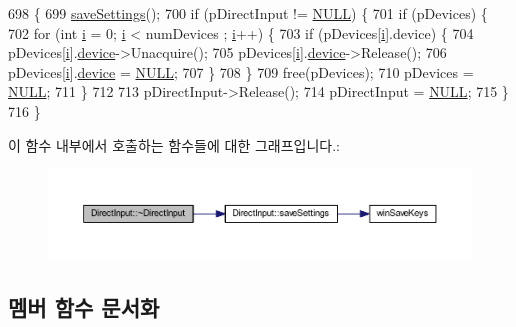 \begin{DoxyCode}
698 \{
699     \mbox{\hyperlink{class_direct_input_aaf3473a97962c8dad1ef6715b5164c9d}{saveSettings}}();
700     \textcolor{keywordflow}{if} (pDirectInput != \mbox{\hyperlink{getopt1_8c_a070d2ce7b6bb7e5c05602aa8c308d0c4}{NULL}}) \{
701         \textcolor{keywordflow}{if} (pDevices) \{
702             \textcolor{keywordflow}{for} (\textcolor{keywordtype}{int} \mbox{\hyperlink{expr-lex_8cpp_acb559820d9ca11295b4500f179ef6392}{i}} = 0; \mbox{\hyperlink{expr-lex_8cpp_acb559820d9ca11295b4500f179ef6392}{i}} < numDevices ; \mbox{\hyperlink{expr-lex_8cpp_acb559820d9ca11295b4500f179ef6392}{i}}++) \{
703                 \textcolor{keywordflow}{if} (pDevices[\mbox{\hyperlink{expr-lex_8cpp_acb559820d9ca11295b4500f179ef6392}{i}}].device) \{
704                     pDevices[\mbox{\hyperlink{expr-lex_8cpp_acb559820d9ca11295b4500f179ef6392}{i}}].\mbox{\hyperlink{structdevice_info_a4e2b017b67b850eb267097f95776273f}{device}}->Unacquire();
705                     pDevices[\mbox{\hyperlink{expr-lex_8cpp_acb559820d9ca11295b4500f179ef6392}{i}}].\mbox{\hyperlink{structdevice_info_a4e2b017b67b850eb267097f95776273f}{device}}->Release();
706                     pDevices[\mbox{\hyperlink{expr-lex_8cpp_acb559820d9ca11295b4500f179ef6392}{i}}].\mbox{\hyperlink{structdevice_info_a4e2b017b67b850eb267097f95776273f}{device}} = \mbox{\hyperlink{getopt1_8c_a070d2ce7b6bb7e5c05602aa8c308d0c4}{NULL}};
707                 \}
708             \}
709             free(pDevices);
710             pDevices = \mbox{\hyperlink{getopt1_8c_a070d2ce7b6bb7e5c05602aa8c308d0c4}{NULL}};
711         \}
712 
713         pDirectInput->Release();
714         pDirectInput = \mbox{\hyperlink{getopt1_8c_a070d2ce7b6bb7e5c05602aa8c308d0c4}{NULL}};
715     \}
716 \}
\end{DoxyCode}
이 함수 내부에서 호출하는 함수들에 대한 그래프입니다.\+:
\nopagebreak
\begin{figure}[H]
\begin{center}
\leavevmode
\includegraphics[width=350pt]{class_direct_input_a9ad919625264b7115fdf20f77c9d2534_cgraph}
\end{center}
\end{figure}


\subsection{멤버 함수 문서화}
\mbox{\label{class_direct_input_a4d81c1ee99e76949dac0acac4bad0937}} 
